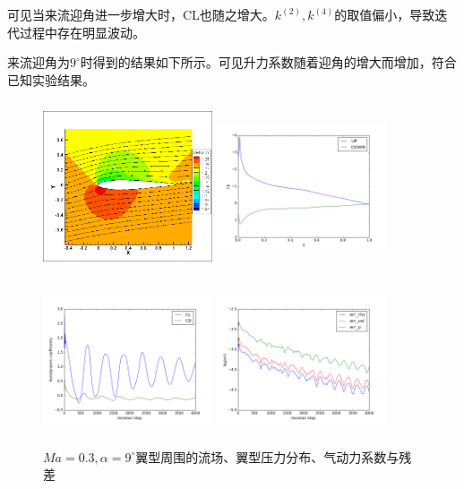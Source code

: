 \documentclass[UTF8]{ctexart}
\begin{document}
\indent 可见当来流迎角进一步增大时，CL也随之增大。$k^{(2)},k^{(4)}$的取值偏小，导致迭代过程中存在明显波动。
\clearpage

\indent 来流迎角为$9^\circ$时得到的结果如下所示。可见升力系数随着迎角的增大而增加，符合已知实验结果。
\begin{figure}[htbp]\centering
  \begin{minipage}{5.5cm}
    \centering
    \includegraphics[height=5cm,width=5cm]{../pic/0.3_9_flowfield.png}
  \end{minipage}%
  \begin{minipage}{5.5cm}
    \centering
    \includegraphics[height=5cm,width=5cm]{../pic/0.3_9_Cp.png}
  \end{minipage}

  \begin{minipage}{5.5cm}
    \centering
    \includegraphics[height=5cm,width=5cm]{../pic/0.3_9_cl_cd.png}
  \end{minipage}%
  \begin{minipage}{5.5cm}
    \centering
    \includegraphics[height=5cm,width=5cm]{../pic/0.3_9_residual.png}
  \end{minipage}
  \caption{$Ma=0.3,\alpha=9^\circ$翼型周围的流场、翼型压力分布、气动力系数与残差}
\end{figure}
\end{document}
